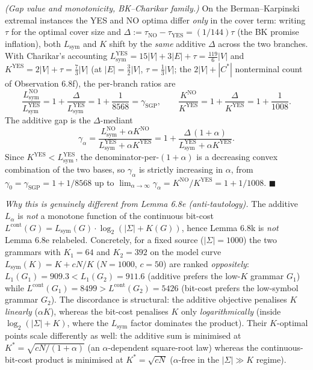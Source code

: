 \documentclass[
]{article}
\begin{document}
\emph{(Gap value and monotonicity, BK--Charikar family.)} On the
Berman--Karpinski extremal instances the YES and NO optima differ
\emph{only} in the cover term: writing $\tau$ for the optimal cover size
and $\Delta := \tau_{\mathrm{NO}} - \tau_{\mathrm{YES}} = (1/144)\tau$
(the BK promise inflation), both $L_{\mathrm{sym}}$ and $K$ shift by the
\emph{same} additive $\Delta$ across the two branches. With Charikar's
accounting $L_{\mathrm{sym}}^{\mathrm{YES}} = 15|V| + 3|E| + \tau =
\tfrac{119}{6}|V|$ and $K^{\mathrm{YES}} = 2|V| + \tau = \tfrac{7}{3}|V|$
(at $|E| = \tfrac32|V|$, $\tau = \tfrac13|V|$; the $2|V| + |C^*|$
nonterminal count of Observation 6.8f), the per-branch ratios are
\[
\frac{L_{\mathrm{sym}}^{\mathrm{NO}}}{L_{\mathrm{sym}}^{\mathrm{YES}}}
  = 1 + \frac{\Delta}{L_{\mathrm{sym}}^{\mathrm{YES}}} = 1 + \frac{1}{8568} = \gamma_{\mathrm{SGP}},
\qquad
\frac{K^{\mathrm{NO}}}{K^{\mathrm{YES}}}
  = 1 + \frac{\Delta}{K^{\mathrm{YES}}} = 1 + \frac{1}{1008}.
\]
The additive gap is the $\Delta$-mediant
\[
\gamma_\alpha
= \frac{L_{\mathrm{sym}}^{\mathrm{NO}} + \alpha K^{\mathrm{NO}}}{L_{\mathrm{sym}}^{\mathrm{YES}} + \alpha K^{\mathrm{YES}}}
= 1 + \frac{\Delta\,(1+\alpha)}{L_{\mathrm{sym}}^{\mathrm{YES}} + \alpha K^{\mathrm{YES}}}.
\]
Since $K^{\mathrm{YES}} < L_{\mathrm{sym}}^{\mathrm{YES}}$, the
denominator-per-$(1+\alpha)$ is a decreasing convex combination of the
two bases, so $\gamma_\alpha$ is strictly increasing in $\alpha$, from
$\gamma_0 = \gamma_{\mathrm{SGP}} = 1 + 1/8568$ up to
$\lim_{\alpha\to\infty}\gamma_\alpha = K^{\mathrm{NO}}/K^{\mathrm{YES}} =
1 + 1/1008$. \hfill$\blacksquare$

\emph{Why this is genuinely different from Lemma 6.8e (anti-tautology).}
The additive $L_\alpha$ is \emph{not} a monotone function of the
continuous bit-cost $L^{\mathrm{cont}}(G) = L_{\mathrm{sym}}(G)\cdot
\log_2(|\Sigma| + K(G))$, hence Lemma 6.8k is \emph{not} Lemma 6.8e
relabeled. Concretely, for a fixed source ($|\Sigma| = 1000$) the two
grammars with $K_1 = 64$ and $K_2 = 392$ on the model curve
$L_{\mathrm{sym}}(K) = K + cN/K$ ($N = 1000$, $c = 50$) are ranked
\emph{oppositely}: $L_1(G_1) = 909.3 < L_1(G_2) = 911.6$ (additive
prefers the low-$K$ grammar $G_1$) while $L^{\mathrm{cont}}(G_1) =
8499 > L^{\mathrm{cont}}(G_2) = 5426$ (bit-cost prefers the low-symbol
grammar $G_2$). The discordance is structural: the additive objective
penalises $K$ \emph{linearly} ($\alpha K$), whereas the bit-cost
penalises $K$ only \emph{logarithmically} (inside $\log_2(|\Sigma|+K)$,
where the $L_{\mathrm{sym}}$ factor dominates the product). Their
$K$-optimal points scale differently as well: the additive sum is
minimised at $K^* = \sqrt{cN/(1+\alpha)}$ (an $\alpha$-dependent
square-root law) whereas the continuous-bit-cost product is minimised at
$K^* = \sqrt{cN}$ ($\alpha$-free in the $|\Sigma| \gg K$ regime).
\end{document}
